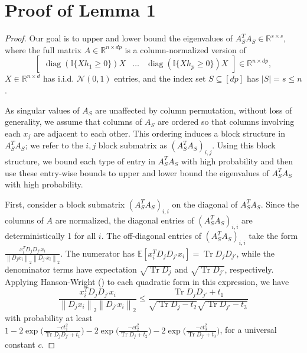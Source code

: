 \documentclass{article} %
\newcommand{\twonorm}[1]{\left\|#1\right\|_{2}}
\DeclareMathOperator{\Tr}{Tr}
\newcommand{\n}{\ensuremath{n}}
\newcommand{\p}{\ensuremath{p}}
\newcommand{\datadim}{\ensuremath{d}}
\newcommand{\X}{\ensuremath{X}}
\newcommand{\h}{\ensuremath{h}}
\DeclareMathOperator{\diag}{diag}
\newcommand{\EE}{\ensuremath{{\mathbb{E}}}}
\newcommand{\1}{\ensuremath{{\sf (i)}}}
\newcommand{\2}{\ensuremath{{\sf (ii)}}}
\newcommand{\3}{\ensuremath{{\sf (iii)}}}
\newcommand{\4}{\ensuremath{{\sf (iv)}}}
\newcommand{\5}{\ensuremath{{\sf (v)}}}
\newcommand{\6}{\ensuremath{{\sf (vi)}}}
\newcommand{\R}{\mathbb{R}}
\begin{document}
\section{Proof of Lemma 1}
\begin{proof}
Our goal is to upper and lower bound the eigenvalues of $A_S^TA_S \in \R^{s \times s}$, where the full matrix $A \in \R^{\n \times \datadim\p}$ is a column-normalized version of
\begin{equation*}
    \begin{bmatrix}
    \diag{(\mathbb{I}\{\X\h_1 \geq 0\})}\X & \dots & \diag{(\mathbb{I}\{\X\h_\p \geq 0\})}\X \end{bmatrix} \in \R^{\n \times \datadim \p} ,
\end{equation*}
$\X \in \R^{\n \times \datadim}$ has i.i.d. $\mathcal{N}(0,1)$ entries, and the index set $S \subseteq [\datadim\p]$ has $|S| = s \leq \n$.

As singular values of $A_S$ are unaffected by column permutation, without loss of generality, we assume that columns of $A_S$ are ordered so that columns involving each $x_j$ are adjacent to each other.
This ordering induces a block structure in $A_S^TA_S$; we refer to the $i,j$ block submatrix as $(A_S^TA_S)_{i,j}$. Using this block structure, we bound each type of entry in $A_S^TA_S$ with high probability and then use these entry-wise bounds to upper and lower bound the eigenvalues of $A_S^TA_S$ with high probability.

First, consider a block submatrix $(A_S^TA_S)_{i,i}$ on the diagonal of $A_S^TA_S$. Since the columns of $A$ are normalized, the diagonal entries of $(A_S^TA_S)_{i,i}$ are deterministically 1 for all $i$. The off-diagonal entries of $(A_S^TA_S)_{i,i}$ take the form $\frac{x_i^TD_jD_{j'}x_i}{\twonorm{D_jx_i}\twonorm{D_{j'}x_i}}$. The numerator has $\EE[x_i^TD_jD_{j'}x_i] = \Tr{D_jD_{j'}}$, while the denominator terms have expectation $\sqrt{\Tr{D_j}}$ and $\sqrt{\Tr{D_{j'}}}$, respectively. Applying Hanson-Wright () to each quadratic form in this expression, we have
\begin{equation}\label{eq:diagonaloffdiagonal_tversion}
     \frac{x_i^TD_jD_{j'}x_i}{\twonorm{D_jx_i}\twonorm{D_{j'}x_i}} \leq \frac{\Tr{D_jD_{j'}} + t_1}{\sqrt{\Tr{D_j} - t_2}\sqrt{\Tr{D_{j'}} - t_3}}
\end{equation}
with probability at least $1 - 2\exp{\big(\frac{-ct_1^2}{\Tr{D_jD_{j'}}+t_1}\big)} - 2\exp{\big(\frac{-ct_2^2}{\Tr{D_j}+t_2}\big)} - 2\exp{\big(\frac{-ct_3^2}{\Tr{D_{j'}}+t_3}\big)}$, for a universal constant $c$. 


\end{proof}
\end{document}
